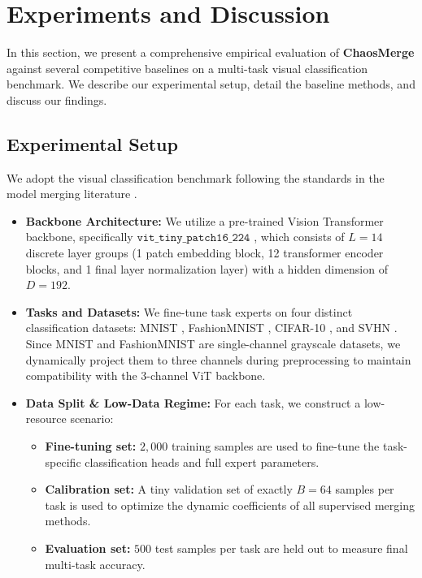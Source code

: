 \section{Experiments and Discussion}
\label{sec:experiments}

In this section, we present a comprehensive empirical evaluation of \textbf{ChaosMerge} against several competitive baselines on a multi-task visual classification benchmark. 
We describe our experimental setup, detail the baseline methods, and discuss our findings.

\subsection{Experimental Setup}
\label{subsec:setup}
We adopt the visual classification benchmark following the standards in the model merging literature \cite{ilharco2022editing, yang2023adamerging}.
\begin{itemize}
    \item \textbf{Backbone Architecture:} We utilize a pre-trained Vision Transformer backbone, specifically $\mathtt{vit\_tiny\_patch16\_224}$ \cite{dosovitskiy2020image}, which consists of $L=14$ discrete layer groups (1 patch embedding block, 12 transformer encoder blocks, and 1 final layer normalization layer) with a hidden dimension of $D=192$.
    \item \textbf{Tasks and Datasets:} We fine-tune task experts on four distinct classification datasets: MNIST \cite{lecun1998gradient}, FashionMNIST \cite{xiao2017fashion}, CIFAR-10 \cite{krizhevsky2009learning}, and SVHN \cite{netzer2011reading}. Since MNIST and FashionMNIST are single-channel grayscale datasets, we dynamically project them to three channels during preprocessing to maintain compatibility with the 3-channel ViT backbone.
    \item \textbf{Data Split \& Low-Data Regime:} For each task, we construct a low-resource scenario:
    \begin{itemize}
        \item \textbf{Fine-tuning set:} $2{,}000$ training samples are used to fine-tune the task-specific classification heads and full expert parameters.
        \item \textbf{Calibration set:} A tiny validation set of exactly $B=64$ samples per task is used to optimize the dynamic coefficients of all supervised merging methods.
        \item \textbf{Evaluation set:} $500$ test samples per task are held out to measure final multi-task accuracy.
    \end{itemize}
\end{itemize}

